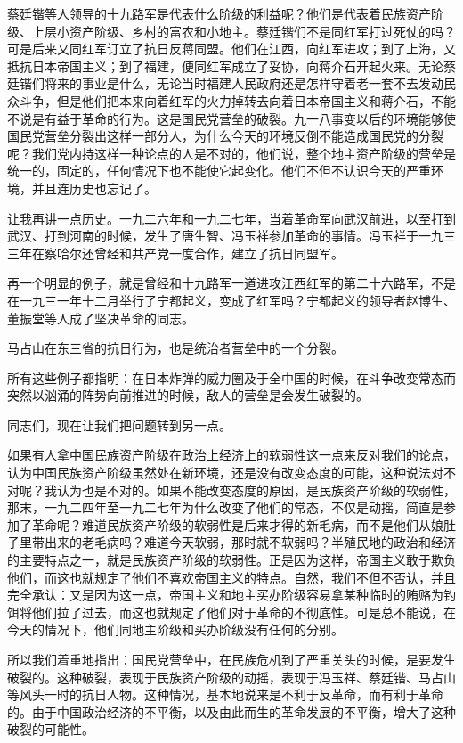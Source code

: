 蔡廷锴等人领导的十九路军是代表什么阶级的利益呢？他们是代表着民族资产阶级、上层小资产阶级、乡村的富农和小地主。蔡廷锴们不是同红军打过死仗的吗？可是后来又同红军订立了抗日反蒋同盟。他们在江西，向红军进攻；到了上海，又抵抗日本帝国主义；到了福建，便同红军成立了妥协，向蒋介石开起火来。无论蔡廷锴们将来的事业是什么，无论当时福建人民政府还是怎样守着老一套不去发动民众斗争，但是他们把本来向着红军的火力掉转去向着日本帝国主义和蒋介石，不能不说是有益于革命的行为。这是国民党营垒的破裂。九一八事变以后的环境能够使国民党营垒分裂出这样一部分人，为什么今天的环境反倒不能造成国民党的分裂呢？我们党内持这样一种论点的人是不对的，他们说，整个地主资产阶级的营垒是统一的，固定的，任何情况下也不能使它起变化。他们不但不认识今天的严重环境，并且连历史也忘记了。

让我再讲一点历史。一九二六年和一九二七年，当着革命军向武汉前进，以至打到武汉、打到河南的时候，发生了唐生智、冯玉祥参加革命的事情。冯玉祥于一九三三年在察哈尔还曾经和共产党一度合作，建立了抗日同盟军。

再一个明显的例子，就是曾经和十九路军一道进攻江西红军的第二十六路军，不是在一九三一年十二月举行了宁都起义，变成了红军吗？宁都起义的领导者赵博生、董振堂等人成了坚决革命的同志。

马占山在东三省的抗日行为，也是统治者营垒中的一个分裂。

所有这些例子都指明：在日本炸弹的威力圈及于全中国的时候，在斗争改变常态而突然以汹涌的阵势向前推进的时候，敌人的营垒是会发生破裂的。

同志们，现在让我们把问题转到另一点。

如果有人拿中国民族资产阶级在政治上经济上的软弱性这一点来反对我们的论点，认为中国民族资产阶级虽然处在新环境，还是没有改变态度的可能，这种说法对不对呢？我认为也是不对的。如果不能改变态度的原因，是民族资产阶级的软弱性，那末，一九二四年至一九二七年为什么改变了他们的常态，不仅是动摇，简直是参加了革命呢？难道民族资产阶级的软弱性是后来才得的新毛病，而不是他们从娘肚子里带出来的老毛病吗？难道今天软弱，那时就不软弱吗？半殖民地的政治和经济的主要特点之一，就是民族资产阶级的软弱性。正是因为这样，帝国主义敢于欺负他们，而这也就规定了他们不喜欢帝国主义的特点。自然，我们不但不否认，并且完全承认：又是因为这一点，帝国主义和地主买办阶级容易拿某种临时的贿赂为钓饵将他们拉了过去，而这也就规定了他们对于革命的不彻底性。可是总不能说，在今天的情况下，他们同地主阶级和买办阶级没有任何的分别。

所以我们着重地指出：国民党营垒中，在民族危机到了严重关头的时候，是要发生破裂的。这种破裂，表现于民族资产阶级的动摇，表现于冯玉祥、蔡廷锴、马占山等风头一时的抗日人物。这种情况，基本地说来是不利于反革命，而有利于革命的。由于中国政治经济的不平衡，以及由此而生的革命发展的不平衡，增大了这种破裂的可能性。

